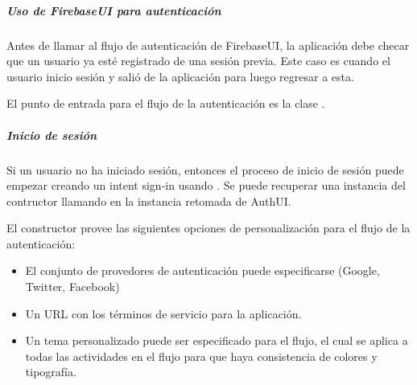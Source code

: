 %
\begin{sphinxVerbatim}[commandchars=\\\{\}]
 
   
\end{sphinxVerbatim}


\subparagraph{Uso de FirebaseUI para autenticación}
\label{\detokenize{dev_docs:uso-de-firebaseui-para-autenticacion}}
Antes de llamar al flujo de autenticación de FirebaseUI, la aplicación debe
checar que un usuario ya esté registrado de una sesión previa. Este caso
es cuando el usuario inicio sesión y salió de la aplicación para luego regresar
a esta.

%
\begin{sphinxVerbatim}[commandchars=\\\{\}]
   
    
  
\end{sphinxVerbatim}

El punto de entrada para el flujo de la autenticación es la clase
.


\subparagraph{Inicio de sesión}
\label{\detokenize{dev_docs:inicio-de-sesion}}
Si un usuario no ha iniciado sesión, entonces el proceso de inicio de sesión
puede empezar creando un intent sign-in usando .
Se puede recuperar una instancia del contructor llamando
 en la instancia retomada de AuthUI.

El constructor provee las siguientes opciones de personalización para el flujo
de la autenticación:
\begin{itemize}
\item {} 
El conjunto de provedores de autenticación puede especificarse (Google, Twitter, Facebook)

\item {} 
Un URL con los términos de servicio para la aplicación.

\item {} 
Un tema personalizado puede ser especificado para el flujo, el cual se aplica a todas las actividades en el flujo para que haya consistencia de colores y tipografía.

\end{itemize}

